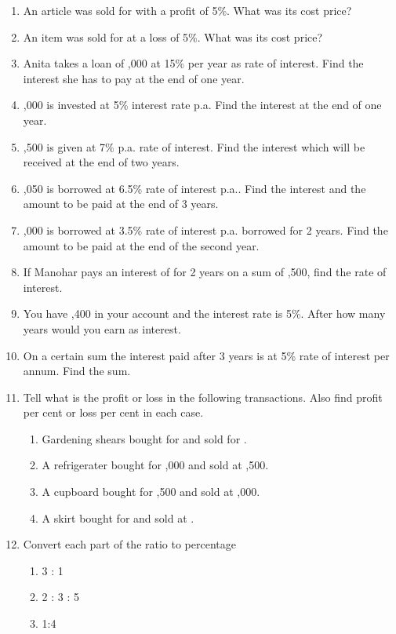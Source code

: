 \begin{enumerate}[label=\thesection.\arabic*,ref=\thesection.\theenumi,resume*]
\item  An article was sold for  with a profit of 5\%. What was its cost price? 
\item  An item was sold for  at a loss of 5\%. What was its cost price?
\item Anita takes a loan of ,000 at 15\% per year as rate of interest. Find the interest she has to pay at the end of one year.
\item {},000 is invested at 5\% interest rate p.a. Find the interest at the end of one year.
\item  {},500 is given at 7\% p.a. rate of interest. Find the interest which will be received at the end of two years.
\item  {},050 is borrowed at 6.5\% rate of interest p.a.. Find the interest and the amount to be paid at the end of 3 years.
\item  {},000 is borrowed at 3.5\% rate of interest p.a. borrowed for 2 years. Find the amount to be paid at the end of the second year.
\item If Manohar pays an interest of  for 2 years on a sum of ,500, find the rate of interest.
\item You have ,400 in your account and the interest rate is 5\%. After how many years would you earn  as interest.
\item On a certain sum the interest paid after 3 years is  at 5\% rate of interest per annum. Find the sum.
\item Tell what is the profit or loss in the following transactions. Also find profit per cent or loss per cent in each case. 
	\begin{enumerate}
\item  Gardening shears bought for  and sold for . 
\item  A refrigerater bought for ,000 and sold at ,500. 
\item  A cupboard bought for ,500 and sold at ,000. 
\item  A skirt bought for  and sold at .
	\end{enumerate}
\item Convert each part of the ratio to percentage
	\begin{enumerate}
		\item  3 : 1
		\item  2 : 3 : 5 
		\item  1:4 

\end{enumerate}
\end{enumerate}
